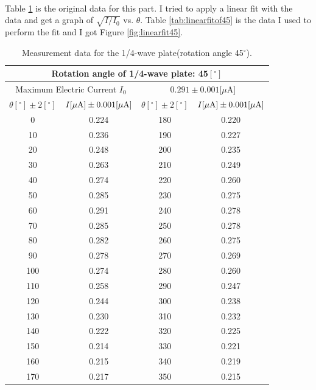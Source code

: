 \documentclass{my_template}
\begin{document}
    \paragraph{} Table \ref{tab:45 quarterplate} is the original data for this part. I tried to apply a linear fit with the data and get a graph of $\sqrt{I/I_0}$ vs. $\theta$. Table \ref{tab:linearfitof45} is the data I used to perform the fit and I got Figure \ref{fig:linearfit45}.
    \begin{table}[!ht]
        \centering
        \begin{tabular}{|c|c||c|c|}
            \hline
            \multicolumn{4}{|c|}{Rotation angle of 1/4-wave plate: 45$[^\circ]$}\\\hline
            \multicolumn{2}{|c||}{Maximum Electric Current $I_0$}&\multicolumn{2}{c|}{$0.291\pm 0.001[\mu$A]}\\\hline
            $\theta[^\circ]\pm 2[^\circ]$&$I[\mu \rm A]\pm 0.001 [\mu A]$&$\theta[^\circ]\pm 2[^\circ]$&$I[\mu \rm A]\pm 0.001 [\mu A]$\\\hline
            0&0.224&180&0.220\\\hline
            10&0.236&190&0.227\\\hline
            20&0.248&200&0.235\\\hline
            30&0.263&210&0.249\\\hline
            40&0.274&220&0.260\\\hline
            50&0.285&230&0.275\\\hline
            60&0.291&240&0.278\\\hline
            70&0.285&250&0.278\\\hline
            80&0.282&260&0.275\\\hline
            90&0.278&270&0.269\\\hline
            100&0.274&280&0.260\\\hline
            110&0.258&290&0.247\\\hline
            120&0.244&300&0.238\\\hline
            130&0.230&310&0.232\\\hline
            140&0.222&320&0.225\\\hline
            150&0.214&330&0.221\\\hline
            160&0.215&340&0.219\\\hline
            170&0.217&350&0.215\\\hline
        \end{tabular}
        \caption{Measurement data for the 1/4-wave plate(rotation angle 45$^\circ$).}
        \label{tab:45 quarterplate}
    \end{table}
\end{document}
